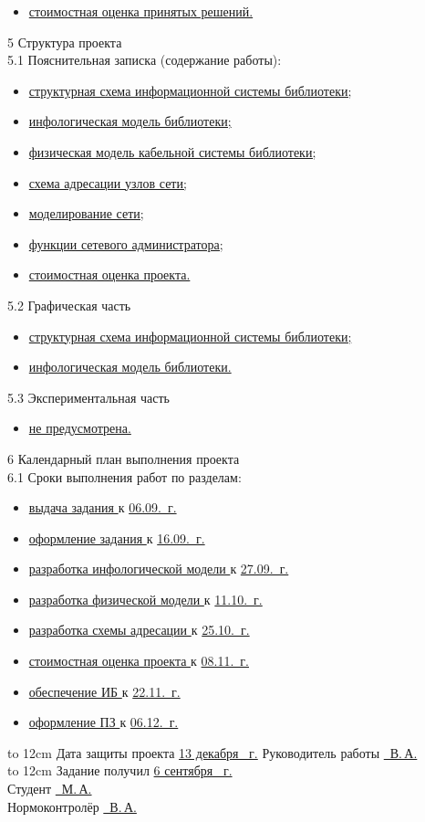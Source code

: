 \begin{singlespace}
\begin{itemize}
\item \uline{стоимостная оценка принятых решений. \hfill \quad}
\end{itemize}
5 Структура проекта\\
5.1 Пояснительная записка (содержание работы):
\begin{itemize}
\item \uline{структурная схема информационной системы библиотеки; \hfill \quad}
\item \uline{инфологическая модель библиотеки; \hfill \quad}
\item \uline{физическая модель кабельной системы библиотеки; \hfill \quad}
\item \uline{схема адресации узлов сети; \hfill \quad}
\item \uline{моделирование сети; \hfill \quad}
\item \uline{функции сетевого администратора; \hfill \quad}
\item \uline{стоимостная оценка проекта. \hfill \quad}
\end{itemize}
5.2 Графическая часть
\begin{itemize}
\item \uline{структурная схема информационной системы библиотеки;\hfill}
\item \uline{инфологическая модель библиотеки.\hfill}
\end{itemize}
5.3 Экспериментальная часть
\begin{itemize}
\item \uline{не предусмотрена.\hfill}
\end{itemize}
6 Календарный план выполнения проекта\\
6.1 Сроки выполнения работ по разделам:
\begin{itemize}
\item \uline{выдача задания \hfill} к \uline{06.09.\the\year~г. }
\item \uline{оформление задания \hfill} к \uline{16.09.\the\year~г. }
\item \uline{разработка инфологической модели \hfill} к \uline{27.09.\the\year~г. }
\item \uline{разработка физической модели \hfill} к \uline{11.10.\the\year~г. }
\item \uline{разработка схемы адресации \hfill} к \uline{25.10.\the\year~г. }
\item \uline{стоимостная оценка проекта \hfill} к \uline{08.11.\the\year~г. }
\item \uline{обеспечение ИБ \hfill} к \uline{22.11.\the\year~г. }  
\item \uline{оформление ПЗ \hfill} к \uline{06.12.\the\year~г.}
\end{itemize}
\hbox to 12cm {Дата защиты проекта \uline{\hfill 13 декабря \the\year~г.}}
Руководитель работы \uline{~В.\,А.}\\
\hbox to 12cm {Задание получил \uline{\hfill6 сентября \the\year~г.}}\\
Студент    \uline{~М.\,А.}\\
Нормоконтролёр    \uline{~В.\,А.}\\
\end{singlespace}
\newpage

